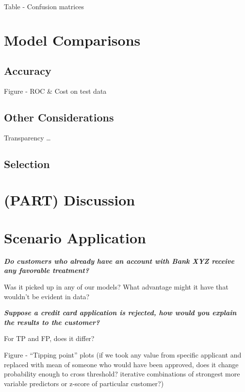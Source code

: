 \documentclass[
]{article}
\begin{document}
Table
- Confusion matrices

\hypertarget{model-comparisons}{%
\section{Model Comparisons}\label{model-comparisons}}

\hypertarget{accuracy}{%
\subsection{Accuracy}\label{accuracy}}

Figure
- ROC \& Cost on test data

\hypertarget{other-considerations}{%
\subsection{Other Considerations}\label{other-considerations}}

Transparency
\ldots{}

\hypertarget{selection}{%
\subsection{Selection}\label{selection}}

\newpage

\hypertarget{part-discussion}{%
\section{(PART) Discussion}\label{part-discussion}}

\hypertarget{scenario-application}{%
\section{Scenario Application}\label{scenario-application}}

\textbf{\emph{Do customers who already have an account with Bank XYZ receive any favorable treatment?}}

Was it picked up in any of our models?
What advantage might it have that wouldn't be evident in data?

\textbf{\emph{Suppose a credit card application is rejected, how would you explain the results to the customer?}}

For TP and FP, does it differ?

Figure
- ``Tipping point'' plots (if we took any value from specific applicant and replaced with mean of someone who would have been approved, does it change probability enough to cross threshold? iterative combinations of strongest more variable predictors or z-score of particular customer?)
\end{document}
